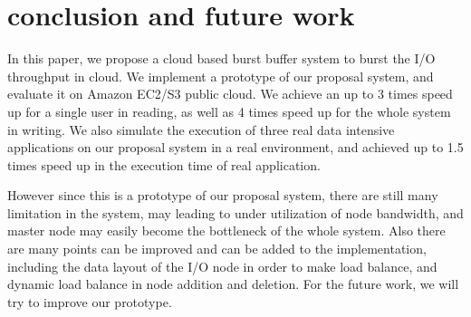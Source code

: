 \section{conclusion and future work}
\label{sec:conclusion}
In this paper, we propose a cloud based burst buffer system to burst the I/O throughput in cloud.
We implement a prototype of our proposal system, and evaluate it on Amazon EC2/S3 public cloud.
We achieve an up to 3 times speed up for a single user in reading, as well as 4 times speed
up for the whole system in writing.
We also simulate the execution of three real data intensive applications on our proposal system in
a real environment, and achieved up to 1.5 times speed up in the execution time of real application.

However since this is a prototype of our proposal system, there are still many limitation in the
system, may leading to under utilization of node bandwidth, and master node may easily become the
bottleneck of the whole system.
Also there are many points can be improved and can be added to the implementation, including the
data layout of the I/O node in order to make load balance, and dynamic load balance in node addition
and deletion.
For the future work, we will try to improve our prototype.
